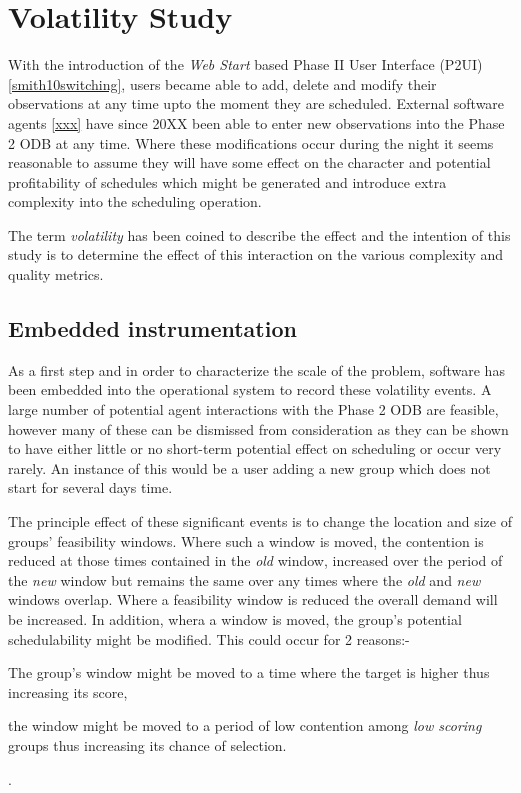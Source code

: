 
\section{Volatility Study}
\label{sect:volatility}

With the introduction of the \emph{Web Start} based Phase II User Interface (P2UI) \ref{smith10switching}, users became able to add, delete and modify their observations at any time upto the moment they are scheduled. External software agents \ref{xxx} have since 20XX been able to enter new observations into the Phase 2 ODB at any time. Where these modifications occur during the night it seems reasonable to assume they will have some effect on the character and potential profitability of schedules which might be generated and introduce extra complexity into the scheduling operation.

The term \emph{volatility} has been coined to describe the effect and the intention of this study is to determine the effect of this interaction on the various complexity and quality metrics.

\subsection{Embedded instrumentation}
As a first step and in order to characterize the scale of the problem, software has been embedded into the operational system to record these volatility events. A large number of potential agent interactions with the Phase 2 ODB are feasible, however many of these can be dismissed from consideration as they can be shown to have either little or no short-term potential effect on scheduling or occur very rarely. An instance of this would be a user adding a new group which does not start for several days time.

The principle effect of these significant events is to change the location and size of groups' feasibility windows. Where such a window is moved, the contention is reduced at those times contained in the \emph{old} window, increased over the period of the \emph{new} window but remains the same over any times where the \emph{old} and \emph{new} windows overlap. Where a feasibility window is reduced the overall demand will be increased. In addition, whera a window is moved, the group's potential schedulability might be modified. This could occur for 2 reasons:- \begin{inparaenum} \item The group's window might be moved to a time where the target is higher thus increasing its score, \item the window might be moved to a period of low contention among \emph{low scoring} groups thus increasing its chance of selection.\end{inparaenum}.

